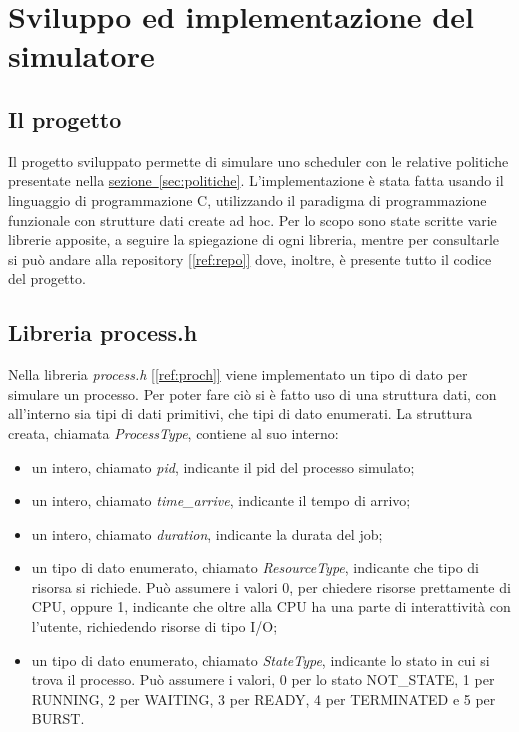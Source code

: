 \documentclass[Lau, oneside]{sapthesis}%
\begin{document}
\chapter{Sviluppo ed implementazione del simulatore}
\label{chap:2}
\section{Il progetto}
Il progetto sviluppato permette di simulare uno scheduler con le relative politiche presentate nella \hyperref[sec:politiche]{sezione~\ref*{sec:politiche}}.
L'implementazione è stata fatta usando il linguaggio di programmazione C, utilizzando il paradigma di programmazione funzionale con strutture dati create ad hoc. 
Per lo scopo sono state scritte varie librerie apposite, a seguire la spiegazione di ogni libreria, mentre per consultarle si può andare alla repository \hyperref[ref:repo]{[\ref*{ref:repo}]} dove, inoltre, è presente tutto il codice del progetto.

\section{Libreria process.h}
\label{sec:process.h}
Nella libreria \textit{process.h} \hyperref[ref:proch]{[\ref*{ref:proch}]} viene implementato un tipo di dato per simulare un processo.
Per poter fare ciò si è fatto uso di una struttura dati, con all'interno sia tipi di dati primitivi, che tipi di dato enumerati.
La struttura creata, chiamata \textit{ProcessType}, contiene al suo interno:
\begin{itemize}
    \item un intero, chiamato \textit{pid}, indicante il pid del processo simulato;
    \item un intero, chiamato \textit{time\_arrive}, indicante il tempo di arrivo;
    \item un intero, chiamato \textit{duration}, indicante la durata del job;
    \item un tipo di dato enumerato, chiamato \textit{ResourceType}, indicante che tipo di risorsa si richiede. Può assumere i valori 0, per chiedere risorse prettamente di CPU, oppure 1, indicante che oltre alla CPU ha una parte di interattività con l'utente, richiedendo risorse di tipo I/O;
    \item un tipo di dato enumerato, chiamato \textit{StateType}, indicante lo stato in cui si trova il processo. Può assumere i valori, 0 per lo stato NOT\_STATE, 1 per RUNNING, 2 per WAITING, 3 per READY, 4 per TERMINATED e 5 per BURST.
\end{itemize}
\end{document}
